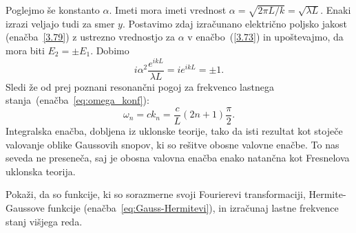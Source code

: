\noindent
Poglejmo še konstanto $\alpha$. Imeti mora imeti vrednost 
$\alpha = \sqrt{2\pi L/k}=\sqrt{\lambda L}$.
Enaki izrazi veljajo tudi za smer $y$. Postavimo zdaj izračunano električno 
poljsko jakost (enačba~\ref{3.79}) z ustrezno vrednostjo za $\alpha$ v 
enačbo~(\ref{3.73}) in upoštevajmo, da mora biti
$E_{2}=\pm E_{1}$. Dobimo 
\begin{equation}
i\alpha^{2}\frac{e^{ikL}}{\lambda L}=ie^{ikL}=\pm1.
\label{3.80}
\end{equation}
Sledi že od prej poznani resonančni pogoj za
frekvenco lastnega stanja~(enačba~\ref{eq:omega_konf}):
\begin{equation}
\omega_{n}=ck_{n}=\frac{c}{L}(2n+1)\frac{\pi}{2}.
\label{3.81}
\end{equation}
Integralska enačba, dobljena iz uklonske teorije, tako da
isti rezultat kot stoječe valovanje oblike Gaussovih snopov, ki so
rešitve obosne valovne enačbe. To nas seveda ne preseneča, saj je
obosna valovna enačba enako natančna kot Fresnelova uklonska teorija.

\begin{definition}
Pokaži, da so funkcije, ki so sorazmerne svoji Fourierevi transformaciji, 
Hermite-Gaussove funkcije (enačba~\ref{eq:Gauss-Hermitevi}), in izračunaj lastne frekvence stanj višjega reda.
\end{definition}

